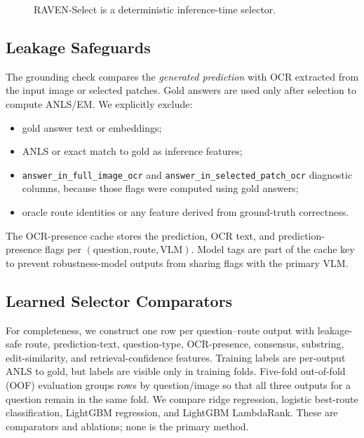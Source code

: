 \documentclass[journal]{IEEEtran}
\begin{document}
\begin{figure}[t]
\centering
{}
\caption{RAVEN-Select is a deterministic inference-time selector.}
\label{fig:algorithm}
\end{figure}

\subsection{Leakage Safeguards}
The grounding check compares the \emph{generated prediction} with OCR extracted
from the input image or selected patches.  Gold answers are used only after
selection to compute ANLS/EM.  We explicitly exclude:
\begin{itemize}[leftmargin=*]
  \item gold answer text or embeddings;
  \item ANLS or exact match to gold as inference features;
  \item \texttt{answer\_in\_full\_image\_ocr} and
  \texttt{answer\_in\_selected\_patch\_ocr} diagnostic columns, because those
  flags were computed using gold answers;
  \item oracle route identities or any feature derived from ground-truth
  correctness.
\end{itemize}
The OCR-presence cache stores the prediction, OCR text, and prediction-presence
flags per $(\text{question},\text{route},\text{VLM})$.  Model tags are part of
the cache key to prevent robustness-model outputs from sharing flags with the
primary VLM.

\subsection{Learned Selector Comparators}
For completeness, we construct one row per question--route output with
leakage-safe route, prediction-text, question-type, OCR-presence, consensus,
substring, edit-similarity, and retrieval-confidence features.  Training labels
are per-output ANLS to gold, but labels are visible only in training folds.
Five-fold out-of-fold (OOF) evaluation groups rows by question/image so that all
three outputs for a question remain in the same fold.  We compare ridge
regression, logistic best-route classification, LightGBM regression, and
LightGBM LambdaRank.  These are comparators and ablations; none is the primary
method.
\end{document}
